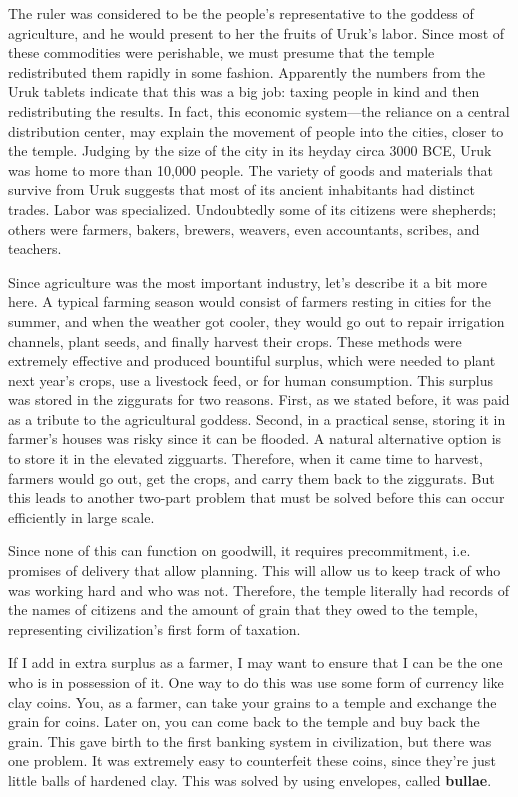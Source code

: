 \documentclass{article}
\begin{document}
    The ruler was considered to be the people's representative to the goddess of agriculture, and he would present to her the fruits of Uruk's labor. Since most of these commodities were perishable, we must presume that the temple redistributed them rapidly in some fashion. Apparently the numbers from the Uruk tablets indicate that this was a big job: taxing people in kind and then redistributing the results. In fact, this economic system—the reliance on a central distribution center, may explain the movement of people into the cities, closer to the temple. Judging by the size of the city in its heyday circa 3000 BCE, Uruk was home to more than 10,000 people. The variety of goods and materials that survive from Uruk suggests that most of its ancient inhabitants had distinct trades. Labor was specialized. Undoubtedly some of its citizens were shepherds; others were farmers, bakers, brewers, weavers, even accountants, scribes, and teachers.

    Since agriculture was the most important industry, let's describe it a bit more here. A typical farming season would consist of farmers resting in cities for the summer, and when the weather got cooler, they would go out to repair irrigation channels, plant seeds, and finally harvest their crops. These methods were extremely effective and produced bountiful surplus, which were needed to plant next year's crops, use a livestock feed, or for human consumption. This surplus was stored in the ziggurats for two reasons. First, as we stated before, it was paid as a tribute to the agricultural goddess. Second, in a practical sense, storing it in farmer's houses was risky since it can be flooded. A natural alternative option is to store it in the elevated zigguarts. Therefore, when it came time to harvest, farmers would go out, get the crops, and carry them back to the ziggurats. But this leads to another two-part problem that must be solved before this can occur efficiently in large scale. 

    \begin{finance}
      Since none of this can function on goodwill, it requires precommitment, i.e. promises of delivery that allow planning. This will allow us to keep track of who was working hard and who was not. Therefore, the temple literally had records of the names of citizens and the amount of grain that they owed to the temple, representing civilization's first form of taxation. 
    \end{finance}

    If I add in extra surplus as a farmer, I may want to ensure that I can be the one who is in possession of it. One way to do this was use some form of currency like clay coins. You, as a farmer, can take your grains to a temple and exchange the grain for coins. Later on, you can come back to the temple and buy back the grain. This gave birth to the first banking system in civilization, but there was one problem. It was extremely easy to counterfeit these coins, since they're just little balls of hardened clay. This was solved by using envelopes, called \textbf{bullae}. 
\end{document}
